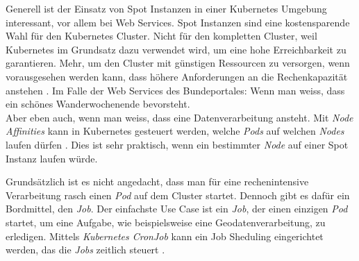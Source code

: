 Generell ist der Einsatz von Spot Instanzen in einer Kubernetes Umgebung interessant, vor allem bei Web Services. Spot Instanzen sind eine kostensparende Wahl für den Kubernetes Cluster. Nicht für den kompletten Cluster, weil Kubernetes im Grundsatz dazu verwendet wird, um eine hohe Erreichbarkeit zu garantieren. Mehr, um den Cluster mit günstigen Ressourcen zu versorgen, wenn vorausgesehen werden kann, dass höhere Anforderungen an die Rechenkapazität anstehen \autocite[89]{CloudNativ:1}. Im Falle der Web Services des Bundeportales: Wenn man weiss, dass ein schönes Wanderwochenende bevorsteht.\\Aber eben auch, wenn man weiss, dass eine Datenverarbeitung ansteht.
Mit \emph{Node Affinities} kann in Kubernetes gesteuert werden, welche \emph{Pods} auf welchen \emph{Nodes} laufen dürfen \autocite[159]{CloudNativ:1}. Dies ist sehr praktisch, wenn ein bestimmter \emph{Node} auf einer Spot Instanz laufen würde.

Grundsätzlich ist es nicht angedacht, dass man für eine rechenintensive Verarbeitung rasch einen \emph{Pod} auf dem Cluster startet. Dennoch gibt es dafür ein Bordmittel, den \emph{Job}. Der einfachste Use Case ist ein \emph{Job}, der einen einzigen \emph{Pod} startet, um eine Aufgabe, wie beispielsweise eine Geodatenverarbeitung, zu erledigen. Mittels \emph{Kubernetes CronJob} kann ein Job Sheduling eingerichtet werden, das die \emph{Jobs} zeitlich steuert \cite{9781788390071}.
